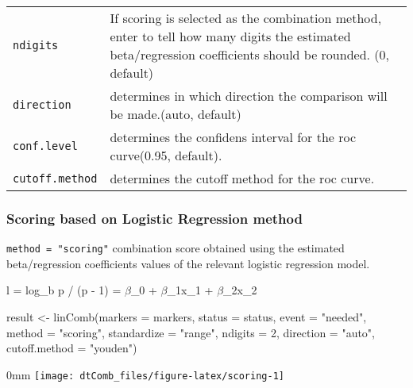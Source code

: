 \documentclass[]{article}
\newcommand{\hlnum}[1]{\textcolor[rgb]{0.816,0.125,0.439}{#1}}%
\newcommand{\hlstr}[1]{\textcolor[rgb]{0.251,0.627,0.251}{#1}}%
\newcommand{\hlstd}[1]{\textcolor[rgb]{0.251,0.251,0.251}{#1}}%
\newenvironment{Shaded}{\begin{myshaded}}{\end{myshaded}}
\newcommand{\DecValTok}[1]{\hlnum{#1}}
\newcommand{\StringTok}[1]{\hlstr{#1}}
\newcommand{\OtherTok}[1]{{#1}}
\newcommand{\FunctionTok}[1]{\hlstd{#1}}
\newcommand{\AttributeTok}[1]{{#1}}
\newcommand{\NormalTok}[1]{\hlstd{#1}}
\begin{document}
\begin{longtable}[]{@{}
  >{\raggedright\arraybackslash}p{}
  >{\raggedright\arraybackslash}p{}@{}}
\texttt{ndigits} & If scoring is selected as the combination method, enter to tell how many digits the estimated beta/regression coefficients should be rounded. (0, default) \\
\texttt{direction} & determines in which direction the comparison will be made.(auto, default) \\
\texttt{conf.level} & determines the confidens interval for the roc curve(0.95, default). \\
\texttt{cutoff.method} & determines the cutoff method for the roc curve. \\
\bottomrule
\end{longtable}

\hypertarget{scoring-based-on-logistic-regression-method}{%
\subsubsection{Scoring based on Logistic Regression method}\label{scoring-based-on-logistic-regression-method}}

\texttt{method = "scoring"} combination score obtained using the estimated beta/regression coefficients values of the relevant logistic regression model.

l = log\_b p / (p - 1) = \(\beta\)\_0 + \(\beta\)\_1x\_1 + \(\beta\)\_2x\_2

\begin{Shaded}
\begin{Highlighting}[]
\NormalTok{result }\OtherTok{\textless{}{-}} \FunctionTok{linComb}\NormalTok{(}\AttributeTok{markers =}\NormalTok{ markers, }
                  \AttributeTok{status =}\NormalTok{ status, }
                  \AttributeTok{event =} \StringTok{"needed"}\NormalTok{, }
                  \AttributeTok{method =} \StringTok{"scoring"}\NormalTok{, }
                  \AttributeTok{standardize =} \StringTok{"range"}\NormalTok{, }
                  \AttributeTok{ndigits =} \DecValTok{2}\NormalTok{, }\AttributeTok{direction =} \StringTok{"auto"}\NormalTok{, }
                  \AttributeTok{cutoff.method =} \StringTok{"youden"}\NormalTok{)}
\end{Highlighting}
\end{Shaded}

\begin{adjustwidth}{\fltoffset}{0mm}
\texttt{[image: dtComb\_files/figure-latex/scoring-1]} \end{adjustwidth}
\end{document}
